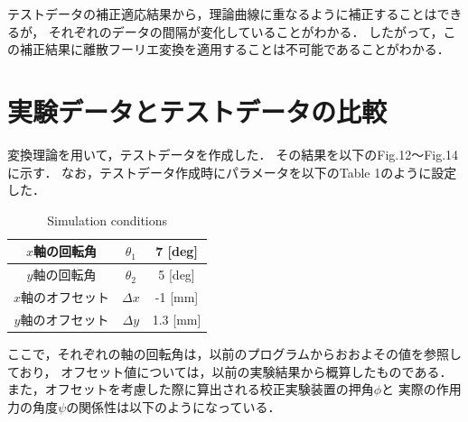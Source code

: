 \documentclass[twocolumn,a4j]{jsarticle}
\begin{document}
\newpage

テストデータの補正適応結果から，理論曲線に重なるように補正することはできるが，
それぞれのデータの間隔が変化していることがわかる．
したがって，この補正結果に離散フーリエ変換を適用することは不可能であることがわかる．

\section{実験データとテストデータの比較}

変換理論を用いて，テストデータを作成した．
その結果を以下のFig.12～Fig.14に示す．
なお，テストデータ作成時にパラメータを以下のTable 1のように設定した．

\begin{table}[htbp]
    \begin{center}
        \caption{Simulation conditions}
        \begin{tabular}{|p{30mm}|p{20mm}|p{30mm}|}
            \hline
            \multicolumn{1}{|c|}{$x$軸の回転角}       & \multicolumn{1}{|c|}{$\theta_1$} & \multicolumn{1}{|c|}{7 [deg]}             \\ \hline
            \multicolumn{1}{|c|}{$y$軸の回転角}       & \multicolumn{1}{|c|}{$\theta_2$} & \multicolumn{1}{|c|}{5 [deg]}             \\ \hline
            \multicolumn{1}{|c|}{$x$軸のオフセット}   & \multicolumn{1}{|c|}{$\Delta x$} & \multicolumn{1}{|c|}{-1 [mm]}             \\ \hline
            \multicolumn{1}{|c|}{$y$軸のオフセット}   & \multicolumn{1}{|c|}{$\Delta y$} & \multicolumn{1}{|c|}{1.3 [mm]}             \\ \hline
        \end{tabular}
    \end{center}
\end{table}

ここで，それぞれの軸の回転角は，以前のプログラムからおおよその値を参照しており，
オフセット値については，以前の実験結果から概算したものである．
また，オフセットを考慮した際に算出される校正実験装置の押角$\phi$と
実際の作用力の角度$\psi$の関係性は以下のようになっている．
\end{document}
